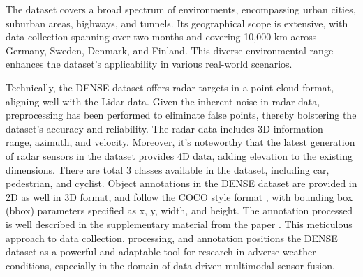 \documentclass[report.tex]{subfiles}
\begin{document}
    The dataset covers a broad spectrum of environments, encompassing urban cities, suburban areas, highways, and tunnels. Its geographical scope is extensive, with data collection spanning over two months and covering 10,000 km across Germany, Sweden, Denmark, and Finland. This diverse environmental range enhances the dataset's applicability in various real-world scenarios.

    Technically, the DENSE dataset offers radar targets in a point cloud format, aligning well with the Lidar data. Given the inherent noise in radar data, preprocessing has been performed to eliminate false points, thereby bolstering the dataset's accuracy and reliability. The radar data includes 3D information - range, azimuth, and velocity. Moreover, it's noteworthy that the latest generation of radar sensors in the dataset provides 4D data, adding elevation to the existing dimensions. There are total 3 classes available in the dataset, including car, pedestrian, and cyclist. Object annotations in the DENSE dataset are provided in 2D as well in 3D format, and follow the COCO style format \cite{lin2014microsoft}, with bounding box (bbox) parameters specified as x, y, width, and height. The annotation processed is well described in the supplementary material from the paper \cite{heide2023adverseweatherfusion}. This meticulous approach to data collection, processing, and annotation positions the DENSE dataset as a powerful and adaptable tool for research in adverse weather conditions, especially in the domain of data-driven multimodal sensor fusion.


\end{document}
